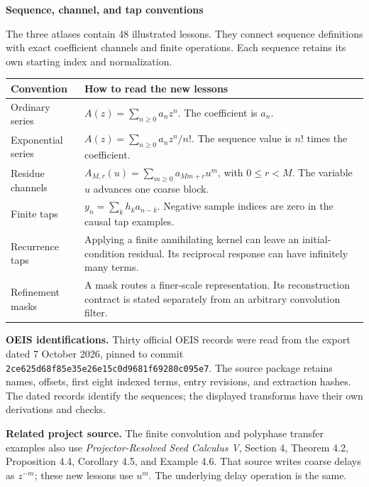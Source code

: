 \clearpage
{}
{\LARGE\bfseries Sequence, channel, and tap conventions\par}
\vspace{0.15in}
The three atlases contain 48 illustrated lessons. They connect sequence definitions with exact coefficient channels and finite operations. Each sequence retains its own starting index and normalization.

\vspace{0.08in}
\begin{tabular}{>{\raggedright\arraybackslash}p{1.35in}>{\raggedright\arraybackslash}p{5in}}
\toprule
Convention & How to read the new lessons\\
\midrule
Ordinary series & $A(z)=\sum_{n\ge0}a_nz^n$. The coefficient is $a_n$.\\[0.09in]
Exponential series & $A(z)=\sum_{n\ge0}a_nz^n/n!$. The sequence value is $n!$ times the coefficient.\\[0.09in]
Residue channels & $A_{M,r}(u)=\sum_{m\ge0}a_{Mm+r}u^m$, with $0\le r<M$. The variable $u$ advances one coarse block.\\[0.09in]
Finite taps & $y_n=\sum_k h_k a_{n-k}$. Negative sample indices are zero in the causal tap examples.\\[0.09in]
Recurrence taps & Applying a finite annihilating kernel can leave an initial-condition residual. Its reciprocal response can have infinitely many terms.\\[0.09in]
Refinement masks & A mask routes a finer-scale representation. Its reconstruction contract is stated separately from an arbitrary convolution filter.\\
\bottomrule
\end{tabular}

\vspace{0.15in}
\textbf{OEIS identifications.} Thirty official OEIS records were read from the export dated 7 October 2026, pinned to commit \texttt{2ce625d68f85e35e26e15c0d9681f69280c095e7}. The source package retains names, offsets, first eight indexed terms, entry revisions, and extraction hashes. The dated records identify the sequences; the displayed transforms have their own derivations and checks.

\vspace{0.08in}
\textbf{Related project source.} The finite convolution and polyphase transfer examples also use \emph{Projector-Resolved Seed Calculus V}, Section 4, Theorem 4.2, Proposition 4.4, Corollary 4.5, and Example 4.6. That source writes coarse delays as $z^{-m}$; these new lessons use $u^m$. The underlying delay operation is the same.

